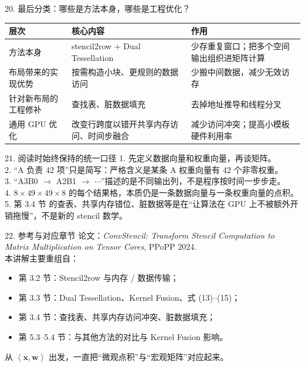 \documentclass[aspectratio=169,11pt]{beamer}
\newcommand{\dotp}[2]{\left\langle #1,#2\right\rangle}
\begin{document}
\begin{frame}{20. 最后分类：哪些是方法本身，哪些是工程优化？}
\small
\begin{tabular}{>{\raggedright\arraybackslash}p{} >{\raggedright\arraybackslash}p{} >{\raggedright\arraybackslash}p{}}
\toprule
层次 & 核心内容 & 作用 \\
\midrule
方法本身 & stencil2row + Dual Tessellation & 少存重复窗口；把多个空间输出组织进矩阵计算 \\
\addlinespace
布局带来的实现优势 & 按需构造小块、更规则的数据访问 & 少搬中间数据，减少无效访存 \\
\addlinespace
针对新布局的工程修补 & 查找表、脏数据填充 & 去掉地址推导和线程分叉 \\
\addlinespace
通用 GPU 优化 & 改变行跨度以错开共享内存访问、时间步融合 & 减少访问冲突；提高小模板硬件利用率 \\
\bottomrule
\end{tabular}
\end{frame}

\begin{frame}{21. 阅读时始终保持的统一口径}
\small
1. 先定义数据向量和权重向量，再谈矩阵。\\[0.5em]
2. “A 负责 42 项”只是简写：严格含义是某条 A 权重向量有 42 个非零权重。\\[0.5em]
3. “A3B0 \(\rightarrow\) A2B1 \(\rightarrow\) \(\cdots\)”描述的是不同输出列，不是程序按时间一步步走。\\[0.5em]
4. \(8\times49\times49\times8\) 的每个结果格，本质仍是一条数据向量与一条权重向量的点积。\\[0.5em]
5. 第 3.4 节 的查表、共享内存错位、脏数据等是在“让算法在 GPU 上不被额外开销拖慢”，不是新的 stencil 数学。
\end{frame}

\begin{frame}{22. 参考与对应章节}
\small
论文：\textit{ConvStencil: Transform Stencil Computation to Matrix Multiplication on Tensor Cores}, PPoPP 2024.\\[0.8em]
本讲解主要重组自：
\begin{itemize}
  \item 第 3.2 节：Stencil2row 与内存 / 数据传输；
  \item 第 3.3 节：Dual Tessellation、Kernel Fusion、式 (13)--(15)；
  \item 第 3.4 节：查找表、共享内存访问冲突、脏数据填充；
  \item 第 5.3--5.4 节：与其他方法的对比与 Kernel Fusion 影响。
\end{itemize}
\vfill
\centering
\large 从 \(\dotp{\bm x}{\bm w}\) 出发，一直把“微观点积”与“宏观矩阵”对应起来。
\end{frame}
\end{document}
